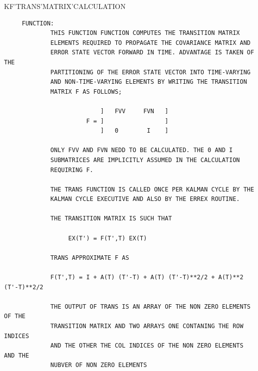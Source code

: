\begin{frame}
KF'TRANS'MATRIX'CALCULATION
\begin{verbatim}
     FUNCTION:
             THIS FUNCTION FUNCTION COMPUTES THE TRANSITION MATRIX
             ELEMENTS REQUIRED TO PROPAGATE THE COVARIANCE MATRIX AND
             ERROR STATE VECTOR FORWARD IN TIME. ADVANTAGE IS TAKEN OF THE
             PARTITIONING OF THE ERROR STATE VECTOR INTO TIME-VARYING
             AND NON-TIME-VARYING ELEMENTS BY WRITING THE TRANSITION
             MATRIX F AS FOLLOWS;

                           ]   FVV     FVN   ]
                       F = ]                 ]
                           ]   0        I    ]

             ONLY FVV AND FVN NEDD TO BE CALCULATED. THE 0 AND I
             SUBMATRICES ARE IMPLICITLY ASSUMED IN THE CALCULATION
             REQUIRING F.

             THE TRANS FUNCTION IS CALLED ONCE PER KALMAN CYCLE BY THE
             KALMAN CYCLE EXECUTIVE AND ALSO BY THE ERREX ROUTINE.

             THE TRANSITION MATRIX IS SUCH THAT

                  EX(T') = F(T',T) EX(T)

             TRANS APPROXIMATE F AS

             F(T',T) = I + A(T) (T'-T) + A(T) (T'-T)**2/2 + A(T)**2 (T'-T)**2/2

             THE OUTPUT OF TRANS IS AN ARRAY OF THE NON ZERO ELEMENTS OF THE
             TRANSITION MATRIX AND TWO ARRAYS ONE CONTANING THE ROW INDICES
             AND THE OTHER THE COL INDICES OF THE NON ZERO ELEMENTS AND THE
             NUBVER OF NON ZERO ELEMENTS

\end{verbatim}
\end{frame}
